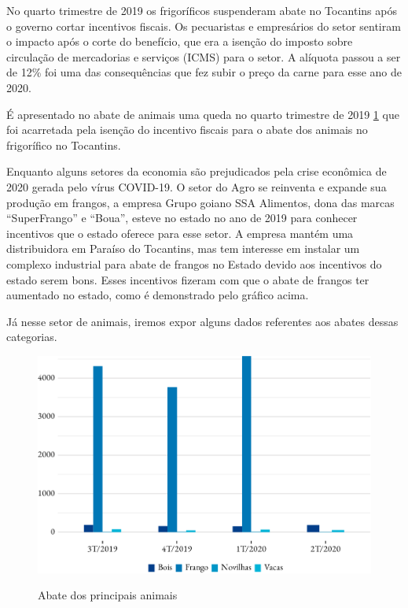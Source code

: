 
\par No quarto trimestre de 2019 os frigoríficos suspenderam abate no Tocantins após o governo cortar incentivos fiscais. Os pecuaristas e empresários do setor sentiram o impacto após o corte do benefício, que era a isenção do imposto sobre circulação de mercadorias e serviços (ICMS) para o setor. A alíquota passou a ser de 12\% foi uma das consequências que fez subir o preço da carne para esse ano de 2020.

\par É apresentado no abate de animais uma queda no quarto trimestre de 2019 \ref{fig:abate} que foi acarretada pela isenção do incentivo fiscais para o abate dos animais no frigorífico no Tocantins. 

\par Enquanto alguns setores da economia são prejudicados pela crise econômica de 2020 gerada pelo vírus COVID-19. O setor do Agro se reinventa e expande sua produção em frangos, a empresa Grupo goiano SSA Alimentos, dona das marcas “SuperFrango” e “Boua”, esteve no estado no ano de 2019 para conhecer incentivos que o estado oferece para esse setor. A empresa mantém uma distribuidora em Paraíso do Tocantins, mas tem interesse em instalar um complexo industrial para abate de frangos no Estado devido aos incentivos do estado serem bons. Esses incentivos fizeram com que o abate de frangos ter aumentado no estado, como é demonstrado pelo gráfico acima.


\par Já nesse setor de animais, iremos expor alguns dados referentes aos abates dessas categorias.

\begin{figure}[h]
	\caption{Abate dos principais animais}
	\includegraphics{fig/abates-1.pdf}
	\label{fig:abate}
\end{figure}
